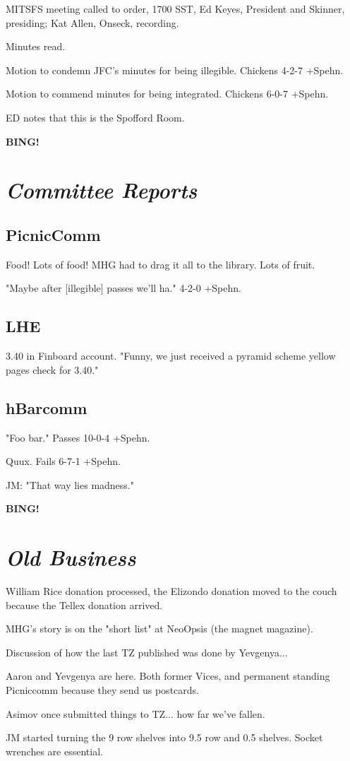 \documentclass[10pt]{article}
\newcommand{\bing}{{\bf BING!} }
\newcommand{\goto}[1]{\bing \vskip 12pt \section*{{\em{#1}}}}
\begin{document}
\vspace{18pt}

\setlength{\parskip}{6pt}

\noindent
MITSFS meeting called to order, 1700 SST, Ed Keyes, President and
Skinner, presiding; Kat Allen,  Onseck, recording.

Minutes read.

Motion to condemn JFC's minutes for being illegible. Chickens 4-2-7 +Spehn.

Motion to commend minutes for being integrated. Chickens 6-0-7 +Spehn.

ED notes that this is the Spofford Room.

\goto{Committee Reports}
\subsection*{PicnicComm}
Food! Lots of food! MHG had to drag it all to the library. Lots of fruit.

"Maybe after [illegible] passes we'll ha." 4-2-0 +Spehn.

\subsection*{LHE}
3.40 in Finboard account. "Funny, we just received a pyramid scheme yellow pages check for 3.40."

\subsection*{hBarcomm}
"Foo bar." Passes 10-0-4 +Spehn.

Quux. Fails 6-7-1 +Spehn.

JM: "That way lies madness."

\goto{Old Business}

William Rice donation processed, the Elizondo donation moved to the couch because the Tellex donation arrived.

MHG's story is on the "short list" at NeoOpsis (the magnet magazine).

Discussion of how the last TZ published was done by Yevgenya...

Aaron and Yevgenya are here. Both former Vices, and permanent standing Picniccomm because they send us postcards.

Asimov once submitted things to TZ... how far we've fallen.

JM started turning the 9 row shelves into 9.5 row and 0.5 shelves. Socket wrenches are essential.
\end{document}
